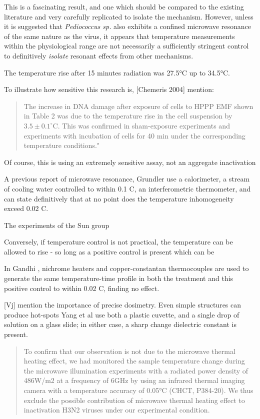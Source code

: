 \documentclass[paper.tex]{subfiles}
\begin{document}
\begin{multicols}{1}
This is a fascinating result, and one which should be compared to the existing literature and very carefully replicated to isolate the mechanism. However, unless it is suggested that {\it Pediococcus sp.} also exhibits a confined microwave resonance of the same nature as the virus, it appears that temperature measurements within the physiological range are not necessarily a sufficiently stringent control to definitively {\it isolate} resonant effects from other mechanisms.


The temperature rise after 15 minutes radiation was 27.5°C up to 34.5°C.


To illustrate how sensitive this research is, [Chemeris 2004] mention:

\begin{quote}
	
	The increase in DNA damage after exposure of cells to HPPP EMF shown in Table 2 was due to the temperature rise in the cell suspension by $3.5\pm0.1^{\circ}  $C. This was confirmed in sham-exposure experiments and experiments with incubation of cells for 40 min under the corresponding temperature conditions."
	
\end{quote}

Of course, this is using an extremely sensitive assay, not an aggregate inactivation 

A previous report of microwave resonance, Grundler \cite{Sharp1983} use a calorimeter, a stream of cooling water controlled to within 0.1 C, an interferometric thermometer, and can state definitively that at no point does the temperature inhomogeneity exceed 0.02 C.

The experiments of the Sun group 

Conversely, if temperature control is not practical, the temperature can be allowed to rise - so long as a positive control is present which can be  

In Gandhi \cite{Basic1983}, nichrome heaters and copper-constantan thermocouples are used to generate the same temperature-time profile in both the treatment and this positive control to within 0.02 C, finding no effect. 


[Vj] mention the importance of precise dosimetry. Even simple structures can produce hot-spots 
Yang et al use both a plastic cuvette, and a single drop of solution on a glass slide; in either case, a sharp change dielectric constant is present.

\begin{quote}
	To confirm that our observation is not due to the microwave thermal heating effect, we had monitored the sample temperature change during the microwave illumination experiments with a radiated power density of 486W/m2 at a frequency of 6GHz by using an infrared thermal imaging camera with a temperature accuracy of 0.05°C (CHCT, P384-20).  We thus exclude the possible contribution of microwave thermal heating effect to inactivation H3N2 viruses under our experimental condition.
\end{quote}


\end{multicols}
\end{document}
